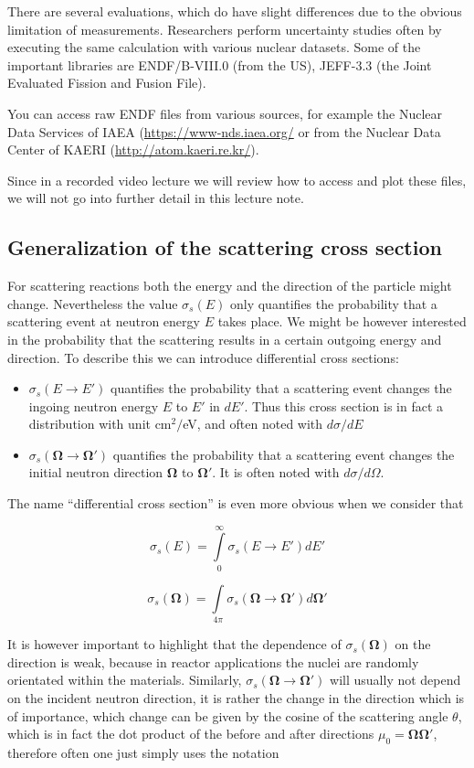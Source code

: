 There are several evaluations, which do have slight differences due to the obvious limitation of measurements. Researchers perform uncertainty studies often by executing the same calculation with various nuclear datasets. Some of the important libraries are ENDF/B-VIII.0 (from the US), JEFF-3.3 (the Joint Evaluated Fission and Fusion File). 

You can access raw ENDF files from various sources, for example the Nuclear Data Services of IAEA (\url{https://www-nds.iaea.org/} or from the Nuclear Data Center of KAERI (\url{http://atom.kaeri.re.kr/}).

Since in a recorded video lecture we will review how to access and plot these files, we will not go into further detail in this lecture note. 

\subsection{Generalization of the scattering cross section}

For scattering reactions both the energy and the direction of the particle might change. Nevertheless the value $\sigma_s(E)$ only quantifies the probability that a scattering event at neutron energy $E$ takes place. We might be however interested in the probability that the scattering results in a certain outgoing energy and direction. To describe this we can introduce differential cross sections:
\begin{itemize}
\item $\sigma_s(E\rightarrow E')$ quantifies the probability that a scattering event changes the ingoing neutron energy $E$ to $E'$ in $dE'$. Thus this cross section is in fact a distribution with unit cm$^2/$eV, and often noted with $d\sigma/dE$
\item $\sigma_s(\mathbf{\Omega}\rightarrow \mathbf{\Omega}')$ quantifies the probability that a scattering event changes the initial neutron direction $\mathbf{\Omega}$ to $\mathbf{\Omega}'$. It is often noted with $d\sigma/d\Omega$.
\end{itemize}

The name ``differential cross section'' is even more obvious when we consider that

$$\sigma_s(E)=\int\limits_0^\infty\sigma_s(E\rightarrow E')dE'$$

$$\sigma_s(\mathbf{\Omega})=\int\limits_{4\pi}\sigma_s(\mathbf{\Omega}\rightarrow \mathbf{\Omega}')d\mathbf{\Omega}'$$

It is however important to highlight that the dependence of $\sigma_s(\mathbf{\Omega})$ on the direction is weak, because in reactor applications the nuclei are randomly orientated within the materials. Similarly, $\sigma_s(\mathbf{\Omega}\rightarrow\mathbf{\Omega}')$ will usually not depend on the incident neutron direction, it is rather the change in the direction which is of importance, which change can be given by the cosine of the scattering angle $\theta$, which is in fact the dot product of the before and after directions $\mu_0=\mathbf{\Omega}\mathbf{\Omega}'$, therefore often one just simply uses the notation

